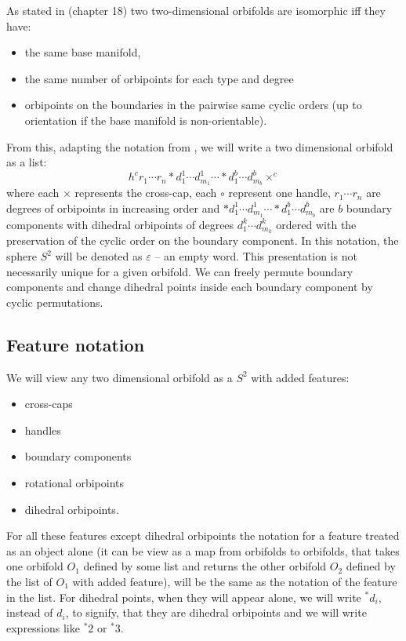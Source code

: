 As stated in \cite{Conway2016} (chapter 18) two two-dimensional orbifolds are 
isomorphic iff they have:
\begin{itemize}
\item the same base manifold, 
\item the same number of orbipoints for each type and degree 
\item orbipoints on the boundaries 
in the pairwise same cyclic orders (up to orientation if the base manifold is non-orientable).
\end{itemize}

From this, adapting the notation from \cite{Conway2016}, we will write 
a two dimensional 
orbifold as a list: 
\begin{equation}
h^cr_1\cdots r_n 
*d_1^1\cdots d_{m_1}^1 \cdots *d_1^b\cdots d_{m_b}^b\times^c
\end{equation}
where each $\times$ represents the cross-cap, 
each $\circ$ represent one handle, 
$r_1\cdots r_n$ are degrees of orbipoints in increasing order and 
$*d_1^1\cdots d_{m_1}^1 \cdots *d_1^b\cdots d_{m_b}^b$ are $b$ boundary components 
with dihedral orbipoints of degrees $d_1^k\cdots d_{m_k}^k$ ordered with the preservation 
of the cyclic order on the boundary component. 
In this notation, the sphere $S^2$ will be denoted as $\varepsilon$ -- an empty word.
This presentation is not necessarily unique for a given orbifold. We can freely permute 
boundary components and change dihedral points inside each boundary component by cyclic 
permutations. 
\subsection{Feature notation}
We will view any two dimensional orbifold as a $S^2$ with added features:
\begin{itemize}
\item cross-caps
\item handles
\item boundary components
\item rotational orbipoints
\item dihedral orbipoints.
\end{itemize}

For all these features except dihedral orbipoints 
the notation for a feature treated as an object alone (it can be view 
as a map from orbifolds to orbifolds, that takes one orbifold $O_1$ defined by some list and 
returns the other orbifold $O_2$ defined by the list of $O_1$ with added feature), will 
be the same as the notation of the feature in the list. For dihedral points, when they will appear 
alone, we will write $^*d_i$, instead of $d_i$, to signify, that they are dihedral orbipoints 
and we will write expressions like $^*2$ or $^*3$. 

